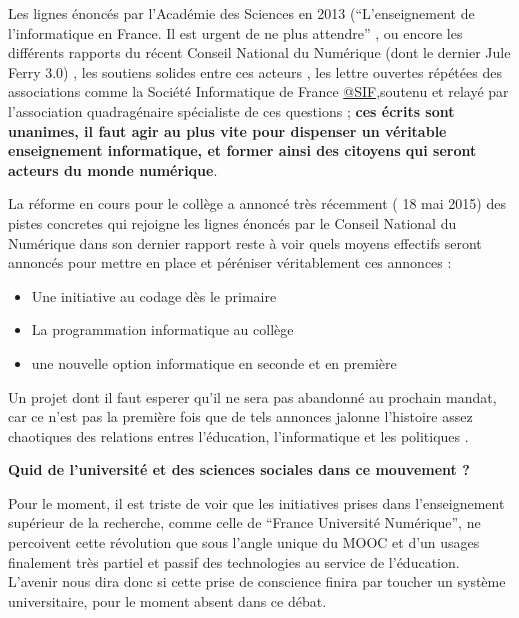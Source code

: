 Les lignes énoncés par l'Académie des Sciences en 2013 (\enquote{L’enseignement de l’informatique en France. Il est urgent de ne plus attendre} \autocite{AScience2013}, ou encore les différents rapports du récent Conseil National du Numérique (dont le dernier Jule Ferry 3.0) \autocite{CNNum2014}, les soutiens solides entre ces acteurs , les lettre ouvertes répétées des associations comme la Société Informatique de France \href{http://www.societe-informatique-de-france.fr/lettre-ouverte-a-monsieur-francois-hollande-president-de-la-republique-concernant-lenseignement-de-linformatique/lettre-ouverte-a-monsieur-francois-hollande-president-de-la-republique-concernant-lenseignement-de-linformatique-2/}{@SIF},soutenu et relayé par l'association quadragénaire spécialiste de ces questions \textcite{EPI2014}; \textbf{ces écrits sont unanimes, il faut agir au plus vite pour dispenser un véritable enseignement informatique, et former ainsi des citoyens qui seront acteurs du monde numérique}.

La réforme en cours pour le collège a annoncé très récemment (\autocite{SIF2015} 18 mai 2015) des pistes concretes qui rejoigne les lignes énoncés  par le Conseil National du Numérique dans son dernier rapport \autocite{CNNum2014} reste à voir quels moyens effectifs seront annoncés pour mettre en place et péréniser véritablement ces annonces :
\begin{itemize}[label=\textbullet]
\item Une initiative au codage dès le primaire
\item La programmation informatique au collège
\item une nouvelle option informatique en seconde et en première
\end{itemize}

Un projet dont il faut esperer qu'il ne sera pas abandonné au prochain mandat, car ce n'est pas la première fois que de tels annonces jalonne l'histoire assez chaotiques des relations entres l'éducation, l'informatique et les politiques .

\textbf{Quid de l'université et des sciences sociales dans ce mouvement ?}

Pour le moment, il est triste de voir que les initiatives prises dans l'enseignement supérieur de la recherche, comme celle de \enquote{France Université Numérique}, ne percoivent cette révolution que sous l'angle unique du MOOC et d'un usages finalement très partiel et passif des technologies au service de l'éducation. L'avenir nous dira donc si cette prise de conscience finira par toucher un système universitaire, pour le moment absent dans ce débat.

